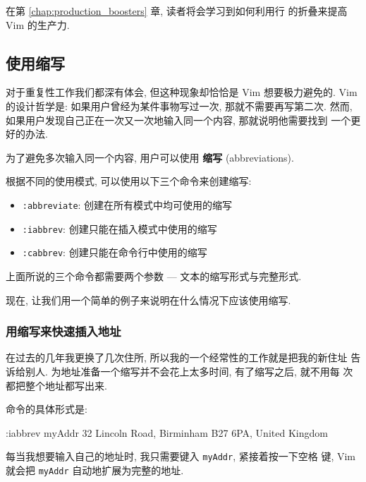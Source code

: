 \begin{warning}
    在第 \ref{chap:production_boosters} 章, 读者将会学习到如何利用行
    的折叠来提高 Vim 的生产力.
\end{warning}

\subsection{使用缩写}
\label{subsec:using_abbreviations}

对于重复性工作我们都深有体会, 但这种现象却恰恰是 Vim 想要极力避免的.
Vim 的设计哲学是: 如果用户曾经为某件事物写过一次, 那就不需要再写第二次.
然而, 如果用户发现自己正在一次又一次地输入同一个内容, 那就说明他需要找到
一个更好的办法.

为了避免多次输入同一个内容, 用户可以使用 \textbf{缩写} (abbreviations).

根据不同的使用模式, 可以使用以下三个命令来创建缩写:
\begin{itemize}
    \item \texttt{:abbreviate}: 创建在所有模式中均可使用的缩写
    \item \texttt{:iabbrev}: 创建只能在插入模式中使用的缩写
    \item \texttt{:cabbrev}: 创建只能在命令行中使用的缩写
\end{itemize}

上面所说的三个命令都需要两个参数 --- 文本的缩写形式与完整形式.

现在, 让我们用一个简单的例子来说明在什么情况下应该使用缩写.

\subsubsection{用缩写来快速插入地址}
\label{subsubsec:using_abbreviations_for_quick_address_insertion}
在过去的几年我更换了几次住所, 所以我的一个经常性的工作就是把我的新住址
告诉给别人. 为地址准备一个缩写并不会花上太多时间, 有了缩写之后, 就不用每
次都把整个地址都写出来.

命令的具体形式是:
\begin{vimcmd}
:iabbrev myAddr 32 Lincoln Road, Birminham B27 6PA, United Kingdom
\end{vimcmd}
每当我想要输入自己的地址时, 我只需要键入 \texttt{myAddr}, 紧接着按一下空格
键, Vim 就会把 \texttt{myAddr} 自动地扩展为完整的地址.


